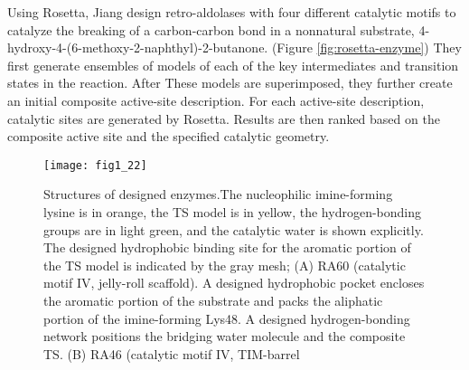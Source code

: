 \begin{refsection}
Using Rosetta, Jiang  design retro-aldolases with four different
catalytic motifs to catalyze the breaking of a carbon-carbon bond in a
nonnatural substrate,
4-hydroxy-4-(6-methoxy-2-naphthyl)-2-butanone\cite{Jiang2008}.  (Figure
\ref{fig:rosetta-enzyme}) They first generate ensembles of models of each of
the key intermediates and transition states in the reaction. After These models
are superimposed, they further create an initial composite active-site
description. For each active-site description, catalytic sites are generated by
Rosetta. Results are then ranked based on the composite active site and the
specified catalytic geometry.
\begin{figure}[h!] \centering \texttt{[image: fig1\_22]}
    \caption[Structures of designed enzymes.The nucleophilic imine-forming
        lysine is in orange, the TS model is in yellow, the hydrogen-bonding
        groups are in light green, and the catalytic water is shown explicitly.
        The designed hydrophobic binding site for the aromatic portion of the
        TS model is indicated by the gray mesh; (A) RA60 (catalytic motif IV,
        jelly-roll scaffold). A designed hydrophobic pocket encloses the
        aromatic portion of the substrate and packs the aliphatic portion of
        the imine-forming Lys48. A designed hydrogen-bonding network positions
        the bridging water molecule and the composite TS. (B) RA46 (catalytic
        motif IV, TIM-barrel scaffold). Tyr83 and Ser210 position the bridging
        water molecule, which facilitates the proton shuffling required in
        active site. (C) RA45 (catalytic motif IV, TIM-barrel scaffold). The
        bridging water is hydrogen-bonded by Ser211 and Glu233; replacing the
    Glu233 with Thr decreases catalytic activity threefold.] {Structures of
        designed enzymes.The nucleophilic imine-forming lysine is in orange,
        the TS model is in yellow, the hydrogen-bonding groups are in light
        green, and the catalytic water is shown explicitly. The designed
        hydrophobic binding site for the aromatic portion of the TS model is
        indicated by the gray mesh; (A) RA60 (catalytic motif IV, jelly-roll
        scaffold). A designed hydrophobic pocket encloses the aromatic portion
        of the substrate and packs the aliphatic portion of the imine-forming
        Lys48. A designed hydrogen-bonding network positions the bridging water
        molecule and the composite TS. (B) RA46 (catalytic motif IV, TIM-barrel
}
\end{figure}
\end{refsection}
